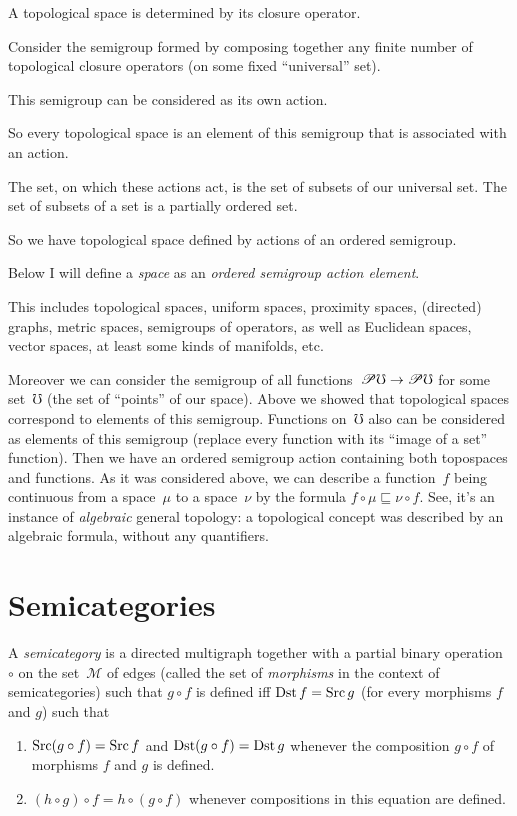 A topological space is determined by its closure operator.

Consider the semigroup formed by composing together any finite number of topological closure operators (on some fixed ``universal'' set).

This semigroup can be considered as its own action.

So every topological space is an element of this semigroup that is associated with an action.

The set, on which these actions act, is the set of subsets of our universal set. The set of subsets of a set is a partially ordered set.

So we have topological space defined by actions of an ordered semigroup.

Below I will define a \emph{space} as an \emph{ordered semigroup action element}.

This includes topological spaces, uniform spaces, proximity spaces, (directed) graphs, metric spaces, semigroups of operators, as well as Euclidean spaces, vector spaces,
at least some kinds of manifolds, etc.

Moreover we can consider the semigroup of all functions~$\mathscr{P}\mho\to\mathscr{P}\mho$ for some set~$\mho$ (the set of ``points'' of our space). Above we showed that topological spaces correspond to elements of this semigroup. Functions on~$\mho$ also can be considered as elements of this semigroup (replace every function with its ``image of a set'' function). Then we have an ordered semigroup action containing both topospaces and functions. As it was considered above, we can describe a function~$f$ being continuous from a space~$\mu$ to a space~$\nu$ by the formula $f\circ\mu\sqsubseteq\nu\circ f$. See, it's an instance of \emph{algebraic} general topology: a topological concept was described by an algebraic formula, without any quantifiers.

\chapter{Semicategories}

\begin{defn}
A \emph{semicategory} is a directed multigraph
together with a partial binary operation $\circ$ on the set~$\mathcal{M}$ of edges (called the set of \emph{morphisms} in the context of semicategories)
such that $g\circ f$ is defined iff $\operatorname{Dst} f=\operatorname{Src} g$ (for every morphisms
$f$ and $g$) such that
\begin{enumerate}
\item $\operatorname{Src}(g\circ f)=\operatorname{Src} f$ and $\operatorname{Dst}(g\circ f)=\operatorname{Dst} g$ whenever the
composition $g\circ f$ of morphisms $f$ and $g$ is defined.
\item $(h\circ g)\circ f=h\circ(g\circ f)$ whenever compositions in this
equation are defined.
\end{enumerate}
\end{defn}

